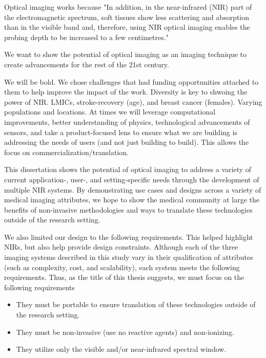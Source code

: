 Optical imaging works because 
"In addition, in the near-infrared (NIR) part of the electromagnetic spectrum, soft tissues show less scattering and absorption than in the visible band and, therefore, using NIR optical imaging enables the probing depth to be increased to a few centimetres."

We want to show the potential of optical imaging as an imaging technique to create advancements for the rest of the 21st century. 


We will be bold. 
We chose challenges that had funding opportunities attached to them to help improve the impact of the work. 
Diversity is key to shwoing the power of NIR. LMICs, stroke-recovery (age), and breast cancer (females). Varying populations and locations. 
At times we will leverage computational improvements, better understanding of physics, technological advancements of sensors, and take a product-focused lens to ensure what we are building is addressing the needs of users (and not just building to build). This allows the focus on commercialization/translation. 

This dissertation shows the potential of optical imaging to address a variety of current application-, user-, and setting-specific needs through the development of multiple \ac{NIR} systems. By demonstrating use cases and designs across a variety of medical imaging attributes, we hope to show the medical community at large the benefits of non-invasive methodologies and ways to translate these technologies outside of the research setting. 


We also limited our design to the following requirements. This helped highlight NIRs, but also help provide design constraints.  Although each of the three imaging systems described in this study vary in their qualification of attributes (such as complexity, cost, and scalability), each system meets the following requirements. Thus, as the title of this thesis suggests, we must focus on the following requirements
\begin{itemize}
  \item They must be portable to ensure translation of these technologies outside of the research setting. 
  \item They must be non-invasive (use no reactive agents)  and non-ionizing.
  \item They utilize only the visible and/or near-infrared spectral window.
\end{itemize}

